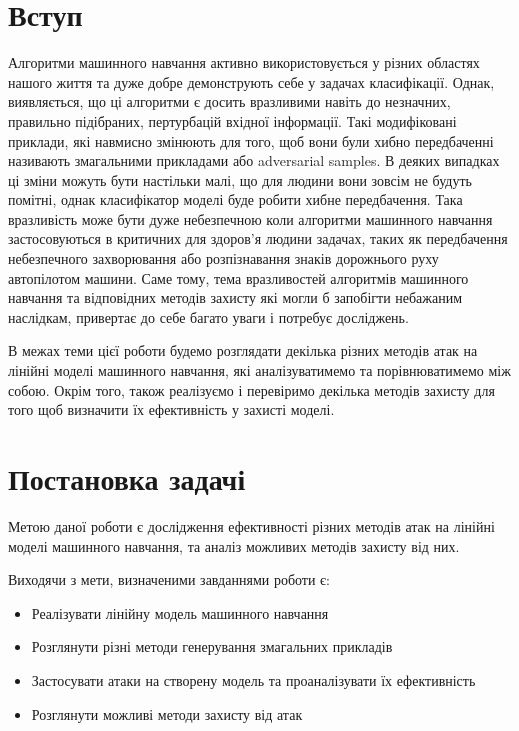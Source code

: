 \documentclass[a4paper,14pt]{extreport}
\begin{document}
	\chapter*{Вступ}
	Алгоритми машинного навчання активно використовується у різних областях нашого життя та дуже добре демонструють себе у задачах класифікації. Однак, виявляється, що ці алгоритми є досить вразливими навіть до незначних, правильно підібраних, пертурбацій вхідної інформації. Такі модифіковані приклади, які навмисно змінюють для того, щоб вони були хибно передбаченні називають змагальними прикладами або adversarial samples. В деяких випадках ці зміни можуть бути настільки малі, що для людини вони зовсім не будуть помітні, однак класифікатор моделі буде робити хибне передбачення. Така вразливість може бути дуже небезпечною коли алгоритми машинного навчання застосовуються в критичних для здоров'я людини задачах, таких як передбачення небезпечного захворювання або розпізнавання знаків дорожнього руху автопілотом машини. Саме тому, тема вразливостей алгоритмів машинного навчання та відповідних методів захисту які могли б запобігти небажаним наслідкам, привертає до себе багато уваги і потребує досліджень.
	
	В межах теми цієї роботи будемо розглядати декілька різних методів атак на лінійні моделі машинного навчання, які аналізуватимемо та порівнюватимемо між собою. Окрім того, також реалізуємо і перевіримо декілька методів захисту для того щоб визначити їх ефективність у захисті моделі. 

	\chapter{Постановка задачі} 
	Метою даної роботи є дослідження ефективності різних методів атак на лінійні моделі машинного навчання, та аналіз можливих методів захисту від них.
	
	Виходячи з мети, визначеними завданнями роботи є:
	\begin{itemize}
	\item Реалізувати лінійну модель машинного навчання
	\item Розглянути різні методи генерування змагальних прикладів
	\item Застосувати атаки на створену модель та проаналізувати їх ефективність
	\item Розглянути можливі методи захисту від атак
	\end{itemize}
	
\end{document}
